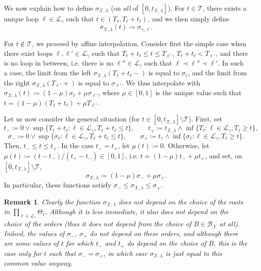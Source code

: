 \documentclass[11pt]{article}
\newtheorem{remark}[theorem]{Remark}
\begin{document}
We now explain how to define $\sigma_{\mathcal{X},\lambda}$ (on {\it all} of $[0, t_{\mathcal{X}, \lambda}]$). For $t\in \mathcal{T}$, there exists a unique loop $\ell\in \mathcal{L}_\gamma$ such that $t\in (T_\ell,T_{\ell}+t_\ell)$, and we then simply define
 \[ \sigma_{\mathcal{X},\lambda}(t)\coloneqq \sigma_{\gamma,\ell}.\]

For $t\notin  \mathcal{T}$, we proceed by affine interpolation. Consider first the simple case when there exist loops $\ell,\ell'\in \mathcal{L}_\gamma$ such that
$T_\ell+t_\ell\leq t \leq T_{\ell'}$, $T_\ell+t_\ell<T_{\ell'}$, and there is no loop in between, i.e. there is no $\ell''\in \mathcal{L}_\gamma $ such that $\ell \prec \ell''\prec \ell'$. In such a case,
the limit from the left $\sigma_{\mathcal{X},\lambda}(T_\ell+t_\ell -)$ is equal to $\sigma_\ell$, and the limit from the right $\sigma_{\mathcal{X},\lambda}(T_{\ell'}+)$ is equal to $\sigma_{\ell'}$. We thus interpolate with
$\sigma_{\mathcal{X},\lambda}(t)\coloneqq  (1-\mu) \sigma_{\ell}+  \mu  \sigma_{\ell'}   $, where
$\mu\in[0,1]$ is the unique value such that $t= (1-\mu) (T_\ell+t_\ell)+  \mu T_{\ell'}$.

Let us now consider the general situation (for $t\in [0,t_{\mathcal{X},\lambda}]\setminus \mathcal{T}$). First, set
\begin{equation}
\label{eq:def:tpm}
t_-\coloneqq 0\vee \sup \{ T_\ell+t_\ell: \ell \in  \mathcal{L}_\gamma, T_\ell+t_\ell\leq t \},
\qquad t_+\coloneqq t_{\mathcal{X},\lambda}  \wedge \inf\{ T_\ell: \ell \in  \mathcal{L}_\gamma, T_\ell\geq t\},
\end{equation}
\[ \sigma_-\coloneqq 0\vee \sup \{ \sigma_\ell: \ell \in  \mathcal{L}_\gamma, T_\ell+t_\ell\leq t \},
\qquad \sigma_+\coloneqq t_\gamma \wedge \inf\{ \sigma_\ell: \ell \in  \mathcal{L}_\gamma, T_\ell\geq t\}
.\]
Then, $t_-\leq t\leq t_+$.
In the case $t_-=t_+$, let $\mu(t)\coloneqq 0$. Otherwise, let $\mu(t)\coloneqq (t-t_-)/(t_+-t_-)\in [0,1]$, i.e. $t= (1-\mu)t_-+\mu t_+$, and set, on $ [0,t_{\mathcal{X},\lambda}]\setminus \mathcal{T}$,
\[\sigma_{\mathcal{X},\lambda}\coloneqq (1-\mu)\sigma_-+\mu \sigma_+.\]
In particular, these functions satisfy $\sigma_-\leq \sigma_{\mathcal{X},\lambda}\leq \sigma_+$.

\begin{remark}
  Clearly the function $\sigma_{\mathcal{X},\lambda}$ does not depend on the choice of the roots in $\prod_{\ell\in \mathcal{L}_\gamma} \Theta_\ell$. Although it is less immediate, it also does not depend on the choice of the orders (thus it does not depend from the choice of $B\in \mathcal{B}_{\mathcal{X}}$ at all). Indeed, the values of $\sigma_-$, $\sigma_+$ do not depend on these orders, and although there are some values of $t$ for which $t_-$ and $t_+$ do depend on the choice of $B$, this is the case only for $t$ such that $\sigma_-=\sigma_+$, in which case $\sigma_{\mathcal{X},\lambda}$ is just equal to this common value anyway.
\end{remark}
\end{document}
